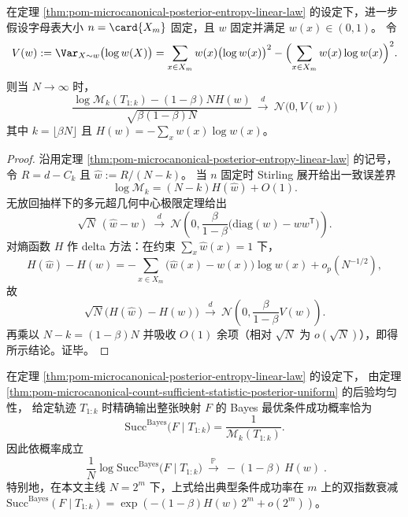 \begin{theorem}\label{thm:pom-microcanonical-posterior-moduli-clt}
在定理 \ref{thm:pom-microcanonical-posterior-entropy-linear-law} 的设定下，进一步假设字母表大小 \(n=\card{X_m}\) 固定，且 \(w\) 固定并满足 \(w(x)\in(0,1)\)。
令
\[
V(w):=\Var_{X\sim w}\bigl(\log w(X)\bigr)
=\sum_{x\in X_m}w(x)\bigl(\log w(x)\bigr)^2-\Bigl(\sum_{x\in X_m}w(x)\log w(x)\Bigr)^2.
\]
则当 \(N\to\infty\) 时，
\[
\boxed{\;
\frac{\log \mathcal{M}_k(T_{1:k})-(1-\beta)NH(w)}{\sqrt{\beta(1-\beta)N}}
\ \xrightarrow{d}\ \mathcal N\bigl(0,V(w)\bigr)\;}
\]
其中 \(k=\lfloor\beta N\rfloor\) 且 \(H(w)=-\sum_x w(x)\log w(x)\)。
\end{theorem}
\begin{proof}
沿用定理 \ref{thm:pom-microcanonical-posterior-entropy-linear-law} 的记号，令 \(R=d-C_k\) 且 \(\widehat w:=R/(N-k)\)。
当 \(n\) 固定时 Stirling 展开给出一致误差界
\[
\log\mathcal{M}_k=(N-k)H(\widehat w)+O(1).
\]
无放回抽样下的多元超几何中心极限定理给出
\[
\sqrt N\,(\widehat w-w)\ \xrightarrow{d}\ \mathcal N\!\left(0,\frac{\beta}{1-\beta}\bigl(\mathrm{diag}(w)-ww^{\mathsf T}\bigr)\right).
\]
对熵函数 \(H\) 作 delta 方法：在约束 \(\sum_x \widehat w(x)=1\) 下，
\[
H(\widehat w)-H(w)=-\sum_{x\in X_m}\bigl(\widehat w(x)-w(x)\bigr)\log w(x)+o_p(N^{-1/2}),
\]
故
\[
\sqrt N\bigl(H(\widehat w)-H(w)\bigr)\ \xrightarrow{d}\ \mathcal N\!\left(0,\frac{\beta}{1-\beta}V(w)\right).
\]
再乘以 \(N-k=(1-\beta)N\) 并吸收 \(O(1)\) 余项（相对 \(\sqrt N\) 为 \(o(\sqrt N)\)），即得所示结论。证毕。
\end{proof}

\begin{corollary}[典型后验精确恢复成功率的双指数衰减]\label{cor:pom-microcanonical-posterior-map-success-double-exponential}
在定理 \ref{thm:pom-microcanonical-posterior-entropy-linear-law} 的设定下，
由定理 \ref{thm:pom-microcanonical-count-sufficient-statistic-posterior-uniform} 的后验均匀性，
给定轨迹 \(T_{1:k}\) 时精确输出整张映射 \(F\) 的 Bayes 最优条件成功概率恰为
\[
\mathrm{Succ}^{\mathrm{Bayes}}\bigl(F\mid T_{1:k}\bigr)=\frac{1}{\mathcal{M}_k(T_{1:k})}.
\]
因此依概率成立
\[
\boxed{\;
\frac{1}{N}\log \mathrm{Succ}^{\mathrm{Bayes}}\bigl(F\mid T_{1:k}\bigr)
\ \xrightarrow{\ \mathbb{P}\ }\ -(1-\beta)\,H(w)\; } .
\]
特别地，在本文主线 \(N=2^m\) 下，上式给出典型条件成功率在 \(m\) 上的双指数衰减
\(
\mathrm{Succ}^{\mathrm{Bayes}}(F\mid T_{1:k})
=\exp(-(1-\beta)H(w)\,2^m+o(2^m))
\)。
\end{corollary}

